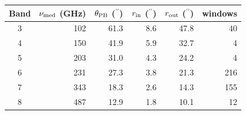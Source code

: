 \begin{tabular}{@{}crrrrr@{}}
\toprule
Band & $\nu_{\rm med}$ (GHz) & $\theta_{\rm PB}$ ($^{\prime\prime}$) & $r_{\rm in}$ ($^{\prime\prime}$) & $r_{\rm out}$ ($^{\prime\prime}$) & windows \\
\midrule
3 & 102 & 61.3 & 8.6 & 47.8 & 40 \\
4 & 150 & 41.9 & 5.9 & 32.7 & 4 \\
5 & 203 & 31.0 & 4.3 & 24.2 & 4 \\
6 & 231 & 27.3 & 3.8 & 21.3 & 216 \\
7 & 343 & 18.3 & 2.6 & 14.3 & 155 \\
8 & 487 & 12.9 & 1.8 & 10.1 & 12 \\
\bottomrule
\end{tabular}
